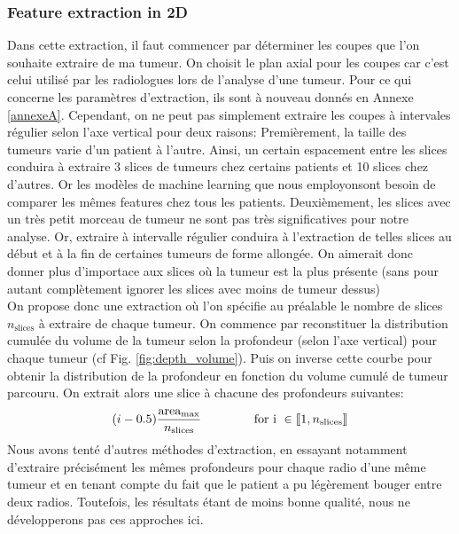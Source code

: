 \documentclass[10pt]{article}
\begin{document}
\subsubsection{Feature extraction in 2D}
Dans cette extraction, il faut commencer par déterminer les coupes que l'on souhaite extraire de ma tumeur. On choisit le plan axial pour les coupes car c'est celui utilisé par les radiologues lors de l'analyse d'une tumeur. Pour ce qui concerne les paramètres d'extraction, ils sont à nouveau donnés en Annexe \ref{annexeA}. Cependant, on ne peut pas simplement extraire les coupes à intervales régulier selon l'axe vertical pour deux raisons:
\indent Premièrement, la taille des tumeurs varie d'un patient à l'autre. Ainsi, un certain espacement entre les slices conduira à extraire 3 slices de tumeurs chez certains patients et 10 slices chez d'autres. Or les modèles de machine learning que nous employonsont besoin de comparer les mêmes features chez tous les patients. Deuxièmement, les slices avec un très petit morceau de tumeur ne sont pas très significatives pour notre analyse. Or, extraire à intervalle régulier conduira à l'extraction de telles slices au début et à la fin de certaines tumeurs de forme allongée. On aimerait donc donner plus d'importace aux slices où la tumeur est la plus présente (sans pour autant complètement ignorer les slices avec moins de tumeur dessus)\\
\indent On propose donc une extraction où l'on spécifie au préalable le nombre de slices $n_{\text{slices}}$ à extraire de chaque tumeur. On commence par reconstituer la distribution cumulée du volume de la tumeur selon la profondeur (selon l'axe vertical) pour chaque tumeur (cf Fig. \ref{fig:depth_volume}). Puis on inverse cette courbe pour obtenir la distribution de la profondeur en fonction du volume cumulé de tumeur parcouru. On extrait alors une slice à chacune des profondeurs suivantes: 
\begin{equation}
(i-0.5) \displaystyle{\frac{\text{area}_{\text{max}}}{n_{\text{slices}}}} \hspace{1.5 cm} \text{for i } \in \llbracket 1,n_{\text{slices}}  \rrbracket
\end{equation}
Nous avons tenté d'autres méthodes d'extraction, en essayant notamment d'extraire précisément les mêmes profondeurs pour chaque radio d'une même tumeur et en tenant compte du fait que le patient a pu légèrement bouger entre deux radios. Toutefois, les résultats étant de moins bonne qualité, nous ne développerons pas ces approches ici.\\
\end{document}
